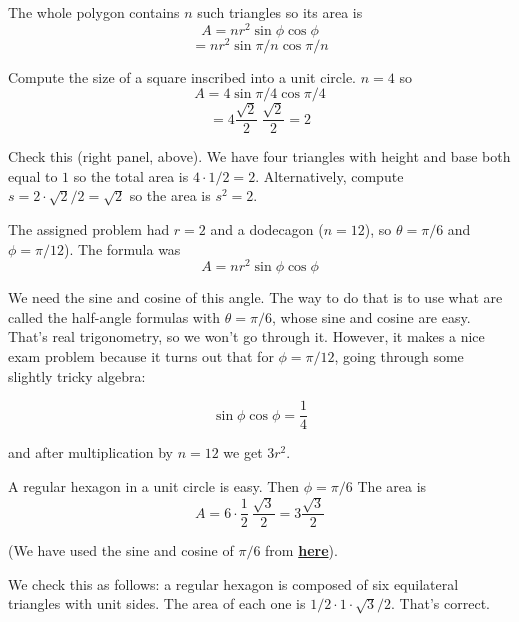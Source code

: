 \documentclass[11pt, oneside]{article}
\begin{document}
The whole polygon contains $n$ such triangles so its area is
\[ A = nr^2 \sin \phi \cos \phi \]
\[ = nr^2 \sin \pi/n \cos \pi/n \]

Compute the size of a square inscribed into a unit circle.  $n = 4$ so
\[ A = 4 \sin \pi/4 \cos \pi/4 \]
\[ = 4 \frac{\sqrt{2}}{2} \ \frac{\sqrt{2}}{2} = 2 \]

Check this (right panel, above).  We have four triangles with height and base both equal to $1$ so the total area is $4 \cdot 1/2 = 2$.  Alternatively, compute $s = 2 \cdot \sqrt{2}/2 = \sqrt{2}$ so the area is $s^2 = 2$.

The assigned problem had $r = 2$ and a dodecagon ($n = 12$), so $\theta = \pi/6$ and $\phi = \pi/12$).  The formula was
\[ A = nr^2 \sin \phi \cos \phi \]

We need the sine and cosine of this angle.  The way to do that is to use what are called the half-angle formulas with $\theta = \pi/6$, whose sine and cosine are easy.  That's real trigonometry, so we won't go through it.  However, it makes a nice exam problem because it turns out that for $\phi = \pi/12$, going through some slightly tricky algebra:

\[ \sin \phi \cos \phi = \frac{1}{4} \]

and after multiplication by $n=12$ we get $3r^2$.

A regular hexagon in a unit circle is easy.  Then $\phi = \pi/6$  The area is
\[ A = 6 \cdot \frac{1}{2} \ \frac{\sqrt{3}}{2} = 3 \frac{\sqrt{3}}{2} \]

(We have used the sine and cosine of $\pi/6$ from \hyperref[sec:sine_and_cosine]{\textbf{here}}).

We check this as follows:  a regular hexagon is composed of six equilateral triangles with unit sides.  The area of each one is $1/2 \cdot 1 \cdot \sqrt{3}/2$.  That's correct.
\end{document}
